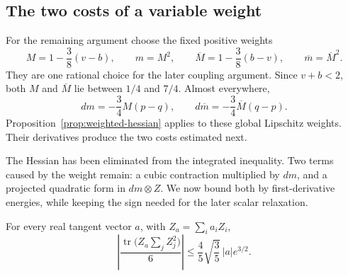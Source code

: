 \subsection{The two costs of a variable weight}

For the remaining argument choose the fixed positive weights
\begin{equation}
 M=1-\frac38(v-b),\qquad m=M^2,
 \qquad
 \overline M=1-\frac38(b-v),\qquad \overline m=\overline M^2.
 \tag{12}\label{eq:12}
\end{equation}
They are one rational choice for the later coupling argument. Since
$v+b<2$, both $M$ and $\overline M$ lie between $1/4$ and $7/4$.
Almost everywhere,
\[
 dm=-\frac34M(p-q),\qquad d\overline m=-\frac34\overline M(q-p).
\]
Proposition~\ref{prop:weighted-hessian} applies to these global Lipschitz
weights. Their derivatives produce the two costs estimated next.

The Hessian has been eliminated from the integrated inequality. Two
terms caused by the weight remain: a cubic contraction multiplied by
$dm$, and a projected quadratic form in $dm\otimes Z$. We now bound
both by first-derivative energies, while keeping the sign needed for
the later scalar relaxation.

\begin{lemma}
\label{lem:cubic-contraction}
For every real tangent vector \(a\), with
\(Z_a=\sum_i a_iZ_i\),
\begin{equation}
 \left|\frac{\operatorname{tr}\bigl(Z_a\sum_jZ_j^2\bigr)}6\right|
 \le \frac45\sqrt{\frac35}\,|a|e^{3/2}.
 \tag{13}\label{eq:13}
\end{equation}
\end{lemma}

